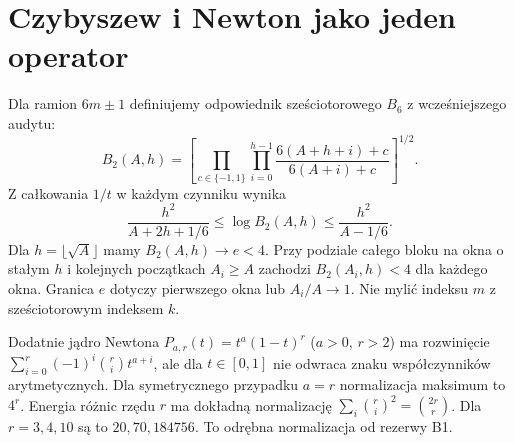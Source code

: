\documentclass[11pt,a4paper]{article}
\begin{document}
\section{Czybyszew i Newton jako jeden operator}
Dla ramion $6m\pm1$ definiujemy odpowiednik sześciotorowego $B_6$ z wcześniejszego audytu:
\[
 B_2(A,h)=\left[\prod_{c\in\{-1,1\}}\prod_{i=0}^{h-1}\frac{6(A+h+i)+c}{6(A+i)+c}\right]^{1/2}.
\]
Z całkowania $1/t$ w każdym czynniku wynika
\[
 \frac{h^2}{A+2h+1/6}\le\log B_2(A,h)\le\frac{h^2}{A-1/6}.
\]
Dla $h=\lfloor\sqrt A\rfloor$ mamy $B_2(A,h)\to e<4$. Przy podziale całego bloku na okna o stałym $h$ i kolejnych początkach $A_i\ge A$ zachodzi $B_2(A_i,h)<4$ dla każdego okna. Granica $e$ dotyczy pierwszego okna lub $A_i/A\to1$. Nie mylić indeksu $m$ z sześciotorowym indeksem $k$.

Dodatnie jądro Newtona $P_{a,r}(t)=t^a(1-t)^r$ ($a>0$, $r>2$) ma rozwinięcie $\sum_{i=0}^r(-1)^i\binom ri t^{a+i}$, ale dla $t\in[0,1]$ nie odwraca znaku współczynników arytmetycznych. Dla symetrycznego przypadku $a=r$ normalizacja maksimum to $4^r$. Energia różnic rzędu $r$ ma dokładną normalizację $\sum_i\binom ri^2=\binom{2r}r$. Dla $r=3,4,10$ są to $20,70,184756$. To odrębna normalizacja od rezerwy B1.
\end{document}
